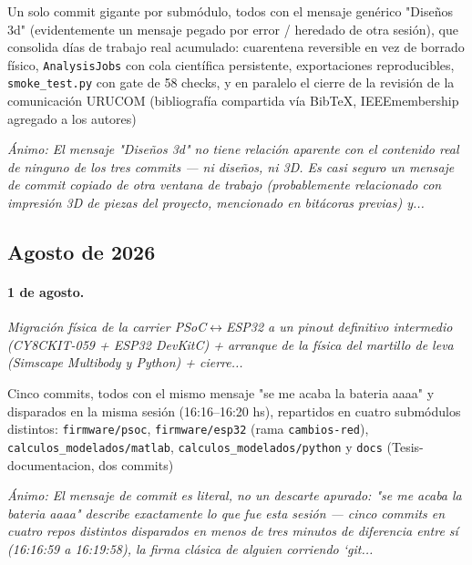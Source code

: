 Un solo commit gigante por submódulo, todos con el mensaje genérico "Diseños 3d" (evidentemente un mensaje pegado por error / heredado de otra sesión), que consolida días de trabajo real acumulado: cuarentena reversible en vez de borrado físico, \texttt{AnalysisJobs} con cola científica persistente, exportaciones reproducibles, \texttt{smoke\_test.py} con gate de 58 checks, y en paralelo el cierre de la revisión de la comunicación URUCOM (bibliografía compartida vía BibTeX, IEEEmembership agregado a los autores)

{\footnotesize\itshape \'Animo: El mensaje "Diseños 3d" no tiene relación aparente con el contenido real de ninguno de los tres commits --- ni diseños, ni 3D. Es casi seguro un mensaje de commit copiado de otra ventana de trabajo (probablemente relacionado con impresión 3D de piezas del proyecto, mencionado en bitácoras previas) y...}

\subsection{Agosto de 2026}
\paragraph{1 de agosto.}
\emph{Migración física de la carrier PSoC$\leftrightarrow$ESP32 a un pinout definitivo intermedio (CY8CKIT-059 + ESP32 DevKitC) + arranque de la física del martillo de leva (Simscape Multibody y Python) + cierre...}

Cinco commits, todos con el mismo mensaje "se me acaba la bateria aaaa" y disparados en la misma sesión (16:16--16:20 hs), repartidos en cuatro submódulos distintos: \texttt{firmware/psoc}, \texttt{firmware/esp32} (rama \texttt{cambios-red}), \texttt{calculos\_modelados/matlab}, \texttt{calculos\_modelados/python} y \texttt{docs} (Tesis-documentacion, dos commits)

{\footnotesize\itshape \'Animo: El mensaje de commit es literal, no un descarte apurado: "se me acaba la bateria aaaa" describe exactamente lo que fue esta sesión --- cinco commits en cuatro repos distintos disparados en menos de tres minutos de diferencia entre sí (16:16:59 a 16:19:58), la firma clásica de alguien corriendo `git...}


